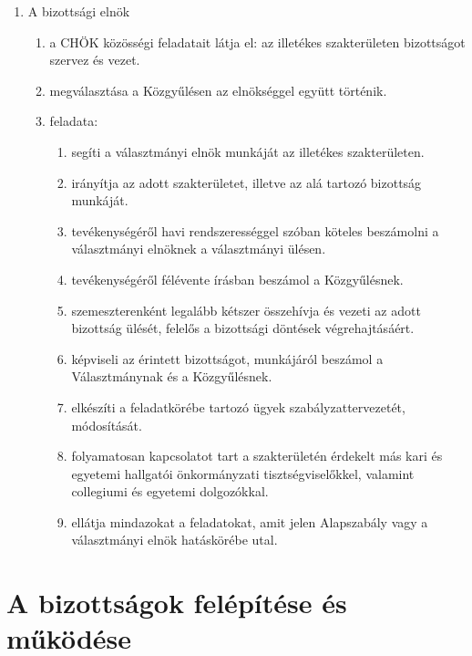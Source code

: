 \documentclass{../styles/rulebook}
\begin{document}
\begin{enumerate}
	\item A bizottsági elnök
	\begin{enumerate}
		\item a CHÖK közösségi feladatait látja el: az illetékes szakterületen bizottságot szervez és vezet.
		\item megválasztása a Közgyűlésen az elnökséggel együtt történik.
		\item feladata:
		\begin{enumerate}
			\item segíti a választmányi elnök munkáját az illetékes szakterületen.
			\item irányítja az adott szakterületet, illetve az alá tartozó bizottság munkáját.
			\item tevékenységéről havi rendszerességgel szóban köteles beszámolni a választmányi elnöknek a választmányi ülésen.
			\item tevékenységéről félévente írásban beszámol a Közgyűlésnek.
			\item szemeszterenként legalább kétszer összehívja és vezeti az adott bizottság ülését, felelős a bizottsági döntések végrehajtásáért.
			\item képviseli az érintett bizottságot, munkájáról beszámol a Választmánynak és a Közgyűlésnek.
			\item elkészíti a feladatkörébe tartozó ügyek szabályzattervezetét, módosítását.
			\item folyamatosan kapcsolatot tart a szakterületén érdekelt más kari és egyetemi hallgatói önkormányzati tisztségviselőkkel, valamint collegiumi és egyetemi dolgozókkal.
			\item ellátja mindazokat a feladatokat, amit jelen Alapszabály vagy a választmányi elnök hatáskörébe utal.
		\end{enumerate}
	\end{enumerate}
\end{enumerate}

\section{A bizottságok felépítése és működése}
\end{document}
